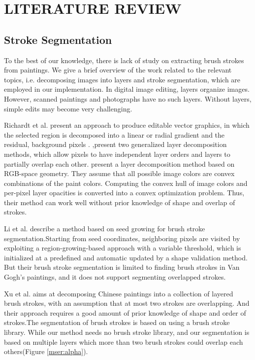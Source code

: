 \chapter{LITERATURE REVIEW}



\section{Stroke Segmentation}

To the best of our knowledge, there is lack of study on extracting brush strokes from paintings. We give a brief overview of the work related to the relevant topics, i.e. decomposing images into layers and stroke segmentation, which are employed in our implementation. In digital image editing, layers organize images. However, scanned paintings and photographs have no such layers. Without layers, simple edits may become very challenging.

Richardt et al.\cite{richardt2014vectorising} present an approach to produce editable vector graphics, in which the selected region is decomposed into a linear or radial gradient and the residual, background pixels . \cite{mccann2009local},\cite{mccann2012soft}present two generalized layer decomposition methods, which allow pixels to have independent layer orders and layers to partially overlap each other.\cite{tan2016decomposing} present a layer decomposition method based on RGB-space geometry. They assume that all possible image colors are convex combinations of the paint colors. Computing the convex hull of image colors and per-pixel layer opacities is converted into a convex optimization problem. Thus, their method can work well without prior knowledge of shape and overlap of strokes.

Li et al.\cite{li2012rhythmic} describe a method based on seed growing for brush stroke segmentation.Starting from seed coordinates, neighboring pixels are visited by exploiting a region-growing-based approach with a variable threshold, which is initialized at a predefined and automatic updated by a shape validation method. But their brush stroke segmentation is limited to finding brush strokes in Van Gogh's paintings, and it does not support segmenting overlapped strokes.
 
Xu et al.\cite{xu2006animating} aims at decomposing Chinese paintings into a collection of layered brush strokes, with an assumption that at most two strokes are overlapping. And their approach requires a good amount of prior knowledge of shape and order of strokes.The segmentation of brush strokes is based on using a brush stroke library. While our method needs no brush stroke library, and our segmentation is based on multiple layers which more than two brush strokes could overlap each others(Figure \ref{mser:alpha}). 

